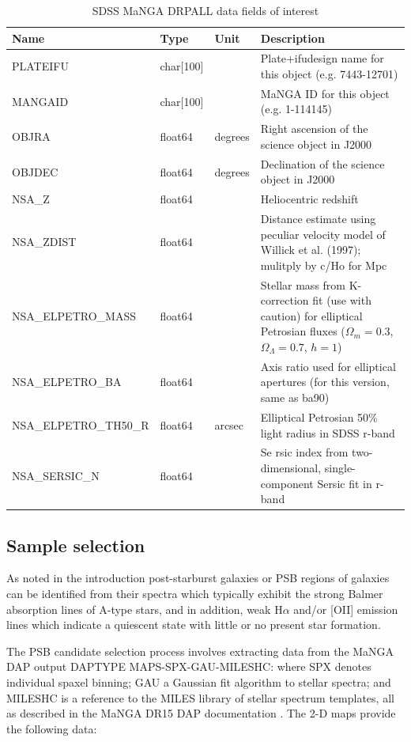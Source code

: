 \begin{table}[h]
\caption[MaNGA DRPALL fields]{SDSS MaNGA DRPALL data fields of interest}
\label{tab:DRPall-table}
\begin{tabular}{|p{3.2cm}|p{1.2cm}||p{1cm}|p{10cm}|}
\hline
Name & Type & Unit & Description \\
\hline
PLATEIFU & char{[}100{]} &  & Plate+ifudesign name for this object (e.g. 7443-12701)\\
MANGAID & char{[}100{]} & & MaNGA ID for this object (e.g. 1-114145)\\
OBJRA & float64 & degrees & Right ascension of the science object in J2000\\
OBJDEC & float64 & degrees & Declination of the science object in J2000\\
NSA\_Z & float64 &  & Heliocentric redshift\\
NSA\_ZDIST & float64 &  & Distance estimate using peculiar velocity model of Willick et al. (1997); mulitply by c/Ho for Mpc\\
NSA\_ELPETRO\_MASS & float64 &  & Stellar mass from K-correction fit (use with caution) for elliptical Petrosian fluxes ($\Omega_m=0.3$, $\Omega_\Lambda=0.7$, $h=1$)\\
NSA\_ELPETRO\_BA & float64 &  & Axis ratio used for elliptical apertures (for this version, same as ba90)\\
NSA\_ELPETRO\_TH50\_R & float64 & arcsec & Elliptical Petrosian 50\% light radius in SDSS r-band\\
NSA\_SERSIC\_N & float64 &  & Se
rsic index from two-dimensional, single-component Sersic fit in r-band\\
\hline
\end{tabular}
\end{table}

\subsection{Sample selection}
As noted in the introduction post-starburst galaxies or PSB regions of galaxies can be identified from their spectra which typically exhibit the strong Balmer absorption lines of A-type stars, and in addition, weak H$\alpha$ and/or [OII] emission lines which indicate a quiescent state with little or no present star formation. 

The PSB candidate selection process involves extracting data from the MaNGA DAP output DAPTYPE MAPS-SPX-GAU-MILESHC: where SPX denotes individual spaxel binning; GAU a Gaussian fit algorithm to stellar spectra; and MILESHC is a reference to the MILES library \citep{2011A&A...532A..95F} of stellar spectrum templates, all as described in the MaNGA DR15 DAP documentation \citet{2019arXiv190100856W}. 
The 2-D maps provide the following data: 

